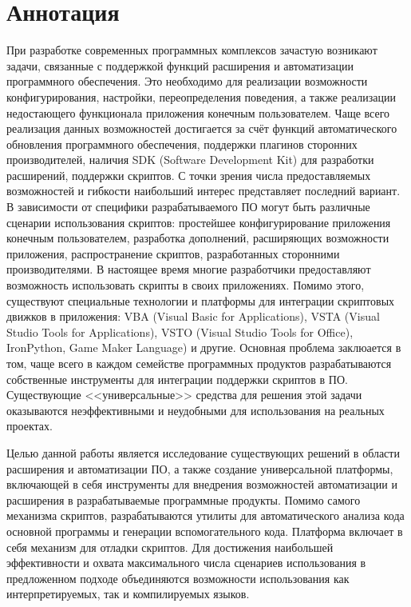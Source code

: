 \setcounter{secnumdepth}{0}
\section*{Аннотация}
\setcounter{secnumdepth}{2}

При разработке современных программных комплексов зачастую возникают задачи, связанные с поддержкой функций расширения и автоматизации программного обеспечения. Это необходимо для реализации возможности конфигурирования, настройки, переопределения поведения, а также реализации недостающего функционала приложения конечным пользователем. Чаще всего реализация данных возможностей достигается за счёт функций автоматического обновления программного обеспечения, поддержки плагинов сторонних производителей, наличия SDK (Software Development Kit) для разработки расширений, поддержки скриптов. С точки зрения числа предоставляемых возможностей и гибкости наибольший интерес представляет последний вариант. В зависимости от специфики разрабатываемого ПО могут быть различные сценарии использования скриптов: простейшее конфигурирование приложения конечным пользователем, разработка дополнений, расширяющих возможности приложения, распространение скриптов, разработанных сторонними производителями. В настоящее время многие разработчики предоставляют возможность использовать скрипты в своих приложениях. Помимо этого, существуют специальные технологии и платформы для интеграции скриптовых движков в приложения: VBA (Visual Basic for Applications), VSTA (Visual Studio Tools for Applications), VSTO (Visual Studio Tools for Office), IronPython, Game Maker Language) и другие. Основная проблема заклюается в том, чаще всего в каждом семействе программных продуктов разрабатываются собственные инструменты для интеграции поддержки скриптов в ПО. Существующие <<универсальные>> средства для решения этой задачи оказываются неэффективными и неудобными для использования на реальных проектах.

Целью данной работы является исследование существующих решений в области расширения и автоматизации ПО, а также создание универсальной платформы, включающей в себя инструменты для внедрения возможностей автоматизации и расширения в разрабатываемые программные продукты. Помимо самого механизма скриптов, разрабатываются утилиты для автоматического анализа кода основной программы и генерации вспомогательного кода. Платформа включает в себя механизм для отладки скриптов. Для достижения наибольшей эффективности и охвата максимального числа сценариев использования в предложенном подходе объединяются возможности использования как интерпретируемых, так и компилируемых языков. 

\pagebreak